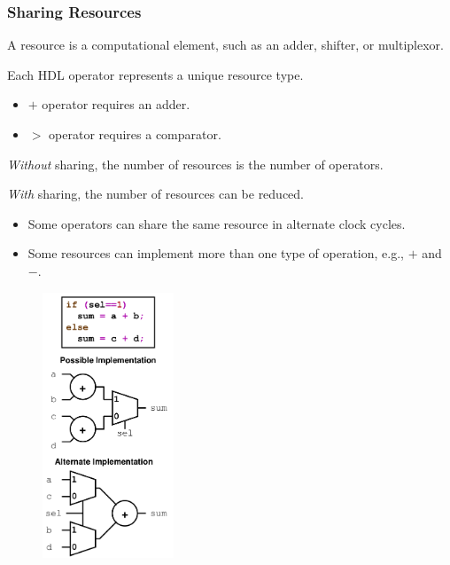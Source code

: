 \documentclass[t, notes, xcolor=table]{beamer}
\begin{document}
\begin{frame}
\frametitle{Sharing Resources}
\scriptsize{
\begin{multicols}{2}
A resource is a computational element, such as an adder, shifter, or multiplexor.
\newline

Each HDL operator represents a unique resource type.
\begin{itemize}
\item $+$ operator requires an adder.
\item $>$ operator requires a comparator.
\end{itemize}
\textit{Without} sharing, the number of resources is the number of operators.
\newline

\textit{With} sharing, the number of resources can be reduced.
\begin{itemize}
\item Some operators can share the same resource in alternate clock cycles.
\item Some resources can implement more than one type of operation, e.g., $+$ and $-$.
\end{itemize}

\vfill
\columnbreak
\begin{figure}
    \includegraphics[width=0.35\textwidth]{img/17_sharing_res.png}
\end{figure}
\end{multicols}
}
\end{frame}
\end{document}
